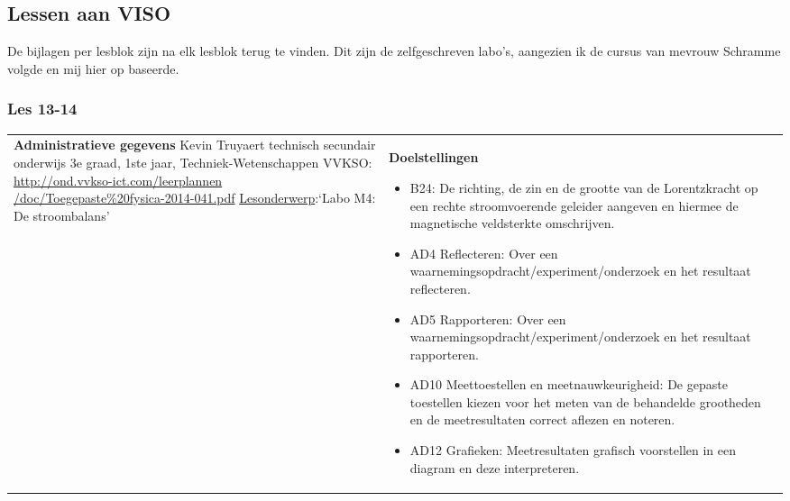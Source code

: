 


\begin{landscape}
	\subsection{Lessen aan VISO}\vspace*{-5mm}
	De bijlagen per lesblok zijn na elk lesblok terug te vinden. Dit zijn de zelfgeschreven labo's, aangezien ik de cursus van mevrouw Schramme volgde en mij hier op baseerde. \vspace*{-15mm}
	\subsubsection{Les 13-14}\vspace*{-5mm}
	\begin{tabularx}{1.56\textwidth}{|p{}|X|}\hline
		\textbf{Administratieve gegevens}\newline\newline
		Kevin Truyaert\newline\newline
		technisch secundair onderwijs\newline
		3e graad, 1ste jaar, Techniek-Wetenschappen\newline
		VVKSO: \href{http://ond.vvkso-ict.com/leerplannen/doc/Toegepaste\%20fysica-2014-041.pdf}{http://ond.vvkso-ict.com/leerplannen /doc/Toegepaste\%20fysica-2014-041.pdf} \newline
		\underline{Lesonderwerp}:\newline `Labo M4: De stroombalans' & \textbf{Doelstellingen}
		\begin{itemize}[itemsep=0.08\baselineskip]
			\item B24: De richting, de zin en de grootte van de Lorentzkracht op een rechte stroomvoerende geleider aangeven en hiermee de magnetische veldsterkte omschrijven. 
			\item AD4 Reflecteren: Over een waarnemingsopdracht/experiment/onderzoek en het resultaat reflecteren.
			\item AD5 Rapporteren: Over een waarnemingsopdracht/experiment/onderzoek en het resultaat rapporteren.
			\item AD10 Meettoestellen en meetnauwkeurigheid: De gepaste toestellen kiezen voor het meten van de behandelde grootheden en de meetresultaten correct aflezen en noteren.
			\item AD12 Grafieken: Meetresultaten grafisch voorstellen in een diagram en deze interpreteren.

\end{itemize}
\end{tabularx}
\end{landscape}
